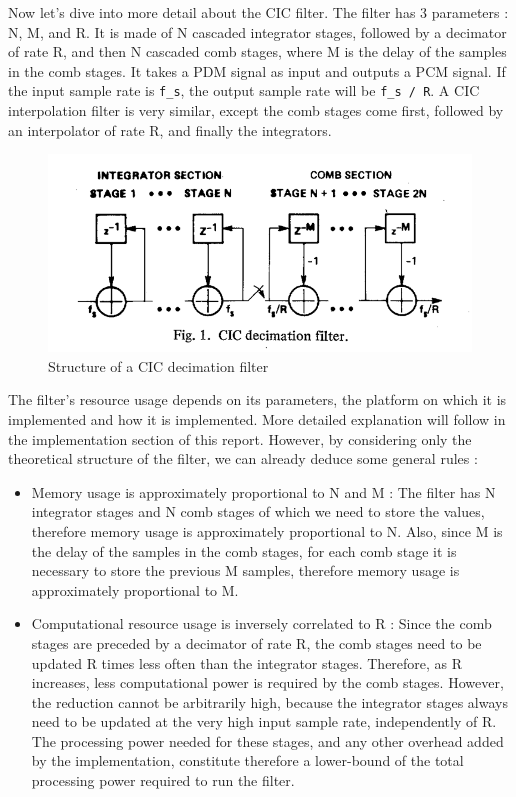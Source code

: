 \documentclass[]{report}
\providecommand{\tightlist}{%
	\setlength{\itemsep}{0pt}\setlength{\parskip}{0pt}}
\begin{document}
Now let's dive into more detail about the CIC filter. The filter has 3
parameters : N, M, and R. It is made of N cascaded integrator stages,
followed by a decimator of rate R, and then N cascaded comb stages,
where M is the delay of the samples in the comb stages. It takes a PDM
signal as input and outputs a PCM signal. If the input sample rate is
\texttt{f\_s}, the output sample rate will be \texttt{f\_s\ /\ R}. A CIC
interpolation filter is very similar, except the comb stages come first,
followed by an interpolator of rate R, and finally the integrators.

\begin{figure}[h]
\centering
\includegraphics[width=0.9\linewidth]{Pictures/CIC_structure.png}
\caption{Structure of a CIC decimation filter}
\end{figure}

The filter's resource usage depends on its parameters, the platform on
which it is implemented and how it is implemented. More detailed
explanation will follow in the implementation section of this report.
However, by considering only the theoretical structure of the filter, we
can already deduce some general rules :

\begin{itemize}
\tightlist
\item
  Memory usage is approximately proportional to N and M : The filter has
  N integrator stages and N comb stages of which we need to store the
  values, therefore memory usage is approximately proportional to N.
  Also, since M is the delay of the samples in the comb stages, for each
  comb stage it is necessary to store the previous M samples, therefore
  memory usage is approximately proportional to M.
\item
  Computational resource usage is inversely correlated to R : Since the
  comb stages are preceded by a decimator of rate R, the comb stages
  need to be updated R times less often than the integrator stages.
  Therefore, as R increases, less computational power is required by the
  comb stages. However, the reduction cannot be arbitrarily high,
  because the integrator stages always need to be updated at the very
  high input sample rate, independently of R. The processing power
  needed for these stages, and any other overhead added by the
  implementation, constitute therefore a lower-bound of the total
  processing power required to run the filter.
\end{itemize}
\end{document}
